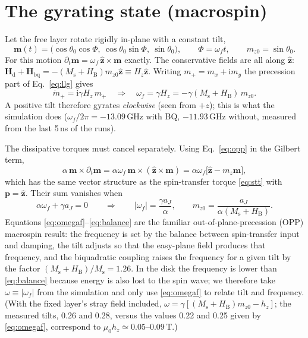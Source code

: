 \documentclass[11pt,a4paper]{article}
\newcommand{\vect}[1]{\mathbf{#1}}
\newcommand{\uv}[1]{\hat{\mathbf{#1}}}
\newcommand{\Ms}{M_\mathrm{s}}
\newcommand{\HB}{H_\mathrm{B}}
\newcommand{\ii}{\mathrm{i}}
\begin{document}
\section{The gyrating state (macrospin)}
\label{sec:macrospin}

Let the free layer rotate rigidly in-plane with a constant tilt,
\begin{equation}
\vect m(t)=\big(\cos\theta_0\cos\Phi,\ \cos\theta_0\sin\Phi,\ \sin\theta_0\big),\qquad
\Phi=\omega_f t,\qquad m_{z0}=\sin\theta_0 .
\label{eq:opp}
\end{equation}
For this motion $\partial_t\vect m=\omega_f\,\uv z\times\vect m$ exactly.
The conservative fields are all along $\uv z$: $\vect H_\mathrm{d}+\vect H_\mathrm{bq}=-(\Ms+\HB)m_{z0}\uv z\equiv H_z\uv z$.
Writing $m_+=m_x+\ii m_y$ the precession part of Eq.~\eqref{eq:llg} gives
\begin{equation}
\dot m_+=\ii\gamma H_z\,m_+\quad\Longrightarrow\quad
\omega_f=\gamma H_z=-\gamma(\Ms+\HB)\,m_{z0}.
\label{eq:omegaf}
\end{equation}
A positive tilt therefore gyrates \emph{clockwise} (seen from $+z$); this is what the simulation does
($\omega_f/2\pi=-13.09$\,GHz with BQ, $-11.93$\,GHz without, measured from the last 5\,ns of the runs).

The dissipative torques must cancel separately.  Using Eq.~\eqref{eq:opp} in the Gilbert term,
\begin{equation}
\alpha\,\vect m\times\partial_t\vect m=\alpha\omega_f\,\vect m\times(\uv z\times\vect m)
=\alpha\omega_f\big[\uv z-m_z\vect m\big],
\end{equation}
which has the same vector structure as the spin-transfer torque \eqref{eq:stt} with $\vect p=\uv z$.
Their sum vanishes when
\begin{equation}
\alpha\omega_f+\gamma a_J=0\qquad\Longrightarrow\qquad
|\omega_f|=\frac{\gamma a_J}{\alpha},\qquad
m_{z0}=\frac{a_J}{\alpha(\Ms+\HB)} .
\label{eq:balance}
\end{equation}
Equations \eqref{eq:omegaf}--\eqref{eq:balance} are the familiar out-of-plane-precession (OPP) macrospin result:
the frequency is set by the balance between spin-transfer input and damping, the tilt adjusts so that the
easy-plane field produces that frequency, and the biquadratic coupling raises the frequency for a given tilt by
the factor $(\Ms+\HB)/\Ms=1.26$.  In the disk the frequency is lower than \eqref{eq:balance} because energy is
also lost to the spin wave; we therefore take $\omega\equiv|\omega_f|$ from the simulation and only use
\eqref{eq:omegaf} to relate tilt and frequency.  (With the fixed layer's stray field included,
$\omega=\gamma[(\Ms+\HB)m_{z0}-h_z]$; the measured tilts, 0.26 and 0.28, versus the values 0.22 and 0.25 given
by \eqref{eq:omegaf}, correspond to $\mu_0h_z\simeq0.05$--$0.09$\,T.)
\end{document}
